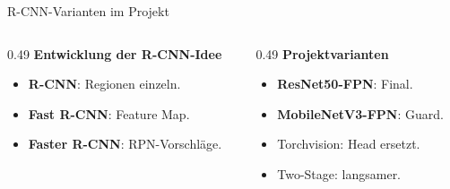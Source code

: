 \begin{frame}{R-CNN-Varianten im Projekt}
\scriptsize
\begin{columns}[T,onlytextwidth]
\begin{column}{0.49\textwidth}
\textbf{Entwicklung der R-CNN-Idee}
\begin{itemize}\setlength\itemsep{0.10em}
    \item \textbf{R-CNN}: Regionen einzeln.
    \item \textbf{Fast R-CNN}: Feature Map.
    \item \textbf{Faster R-CNN}: RPN-Vorschläge.
\end{itemize}
\end{column}
\begin{column}{0.49\textwidth}
\textbf{Projektvarianten}
\begin{itemize}\setlength\itemsep{0.10em}
    \item \textbf{ResNet50-FPN}: Final.
    \item \textbf{MobileNetV3-FPN}: Guard.
    \item Torchvision: Head ersetzt.
    \item Two-Stage: langsamer.
\end{itemize}
\end{column}
\end{columns}
\end{frame}

